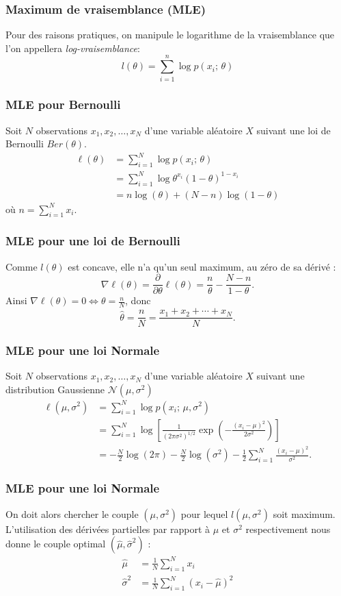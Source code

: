\begin{frame}
  \frametitle{Maximum de vraisemblance (MLE)}
  Pour des raisons pratiques, on manipule le logarithme de la vraisemblance que l'on appellera \textit{log-vraisemblance}:
  \[
      l(\theta) = \sum_{i=1}^n \log p(x_i; \, \theta)
  \]
\end{frame}

\begin{frame}
  \frametitle{MLE pour Bernoulli}
Soit $N$ observations $x_1,x_2,\ldots,x_N$ d'une variable aléatoire $X$ suivant une loi de Bernoulli $Ber(\theta)$.
\begin{align*}
\ell(\theta) 	&= \sum_{i=1}^N \log p(x_i; \, \theta) \\
				&= \sum_{i=1}^N \log \theta^{x_i}(1-\theta)^{1-x_i}\\
				&= n\log(\theta)+(N-n)\log(1-\theta)
\end{align*} 
où $n=\sum_{i=1}^N x_i$.\\ 
\end{frame}

\begin{frame}
  \frametitle{MLE pour une loi de Bernoulli}
Comme $l(\theta)$ est concave, elle n'a qu'un seul maximum, au zéro de sa dérivé :
$$\nabla \ell(\theta)=\frac{\partial}{\partial\theta} \ell(\theta) = \frac{n}{\theta}-\frac{N-n}{1-\theta}.$$  
Ainsi $\nabla \ell(\theta) = 0 \Longleftrightarrow \theta =\frac{n}{N}$, donc
$$\hat{\theta} = \frac{n}{N} = \frac{x_1+x_2+\cdots+x_N}{N}.$$
\end{frame}

\begin{frame}
  \frametitle{MLE pour une loi Normale}
  Soit $N$ observations $x_1,x_2,\ldots,x_N$ d'une variable aléatoire $X$ suivant une distribution Gaussienne $\mathcal{N}(\mu,\sigma^2)$
\begin{align*}
\ell(\mu,\sigma^2) 	&= \sum_{i=1}^N \log p(x_i; \, \mu,\sigma^2) \\
				&= \sum_{i=1}^N \log\left[ \frac{1}{(2\pi\sigma^2)^{1/2}}\exp\left(-\frac{(x_i-\mu)^2}{2\sigma^2}\right)\right]\\
				&= -\frac{N}{2}\log(2\pi)-\frac{N}{2}\log(\sigma^2)-\frac{1}{2}\sum_{i=1}^N \frac{(x_i-\mu)^2}{\sigma^2}.				
\end{align*} 
\end{frame}

\begin{frame}
  \frametitle{MLE pour une loi Normale}
  On doit alors chercher le couple $(\mu, \sigma^2)$ pour lequel $l(\mu,\sigma^2)$ soit maximum. L'utilisation des dérivées partielles par rapport à $\mu$ et $\sigma^2$ respectivement nous donne le couple optimal $(\hat{\mu},\hat{\sigma}^2)$ :
\begin{align*}
\hat{\mu}&=\frac{1}{N}\sum_{i=1}^N x_i \\
\hat{\sigma}^2&=\frac{1}{N}\sum_{i=1}^N \left(x_i-\hat{\mu}\right)^2
\end{align*}
\end{frame}
